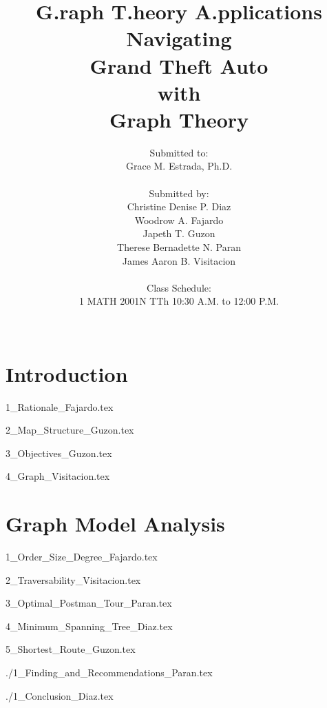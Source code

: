 \documentclass[a4paper, 12pt]{article}
\title{\Huge{\textbf{G}.raph \textbf{T}.heory \textbf{A}.pplications} \\ \large{Navigating \\ Grand Theft Auto \\ with \\ Graph Theory}}
\author{Submitted to: \\ Grace M. Estrada, Ph.D.\\\\ Submitted by: \\ Christine Denise P. Diaz \\ Woodrow A. Fajardo \\ Japeth T. Guzon \\ Therese Bernadette N. Paran \\ James Aaron B. Visitacion \\\\ Class Schedule: \\ 1 MATH 2001N TTh 10:30 A.M. to 12:00 P.M.\\\\}
\begin{document}
	\maketitle
	
	\newpage
	\tableofcontents{}
	
	\newpage
	\section*{Introduction}
	{1_Rationale_Fajardo.tex}
	
	{2_Map_Structure_Guzon.tex}
	
	{3_Objectives_Guzon.tex}
	
	{4_Graph_Visitacion.tex}
	
	\newpage
	\section*{Graph Model Analysis}
	{1_Order_Size_Degree_Fajardo.tex}
	
	{2_Traversability_Visitacion.tex}
	
	{3_Optimal_Postman_Tour_Paran.tex}
	
	{4_Minimum_Spanning_Tree_Diaz.tex}
	
	{5_Shortest_Route_Guzon.tex}
	
	\newpage
	{./1_Finding_and_Recommendations_Paran.tex}
	
	\newpage
	{./1_Conclusion_Diaz.tex}
	
\end{document}
